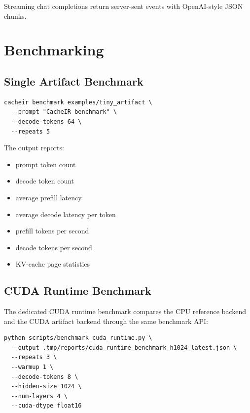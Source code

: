 \documentclass[11pt]{article}
\begin{document}
Streaming chat completions return server-sent events with OpenAI-style JSON
chunks.

\section{Benchmarking}

\subsection{Single Artifact Benchmark}

\begin{lstlisting}
cacheir benchmark examples/tiny_artifact \
  --prompt "CacheIR benchmark" \
  --decode-tokens 64 \
  --repeats 5
\end{lstlisting}

The output reports:

\begin{itemize}[leftmargin=*]
  \item prompt token count
  \item decode token count
  \item average prefill latency
  \item average decode latency per token
  \item prefill tokens per second
  \item decode tokens per second
  \item KV-cache page statistics
\end{itemize}

\subsection{CUDA Runtime Benchmark}

The dedicated CUDA runtime benchmark compares the CPU reference backend and the
CUDA artifact backend through the same benchmark API:

\begin{lstlisting}
python scripts/benchmark_cuda_runtime.py \
  --output .tmp/reports/cuda_runtime_benchmark_h1024_latest.json \
  --repeats 3 \
  --warmup 1 \
  --decode-tokens 8 \
  --hidden-size 1024 \
  --num-layers 4 \
  --cuda-dtype float16
\end{lstlisting}
\end{document}
